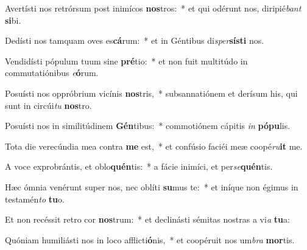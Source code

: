 \item Avertísti nos retrórsum post inimícos \textbf{nos}tros:~* et qui odérunt nos, diripié\textit{bant} \textbf{si}bi.
\item Dedísti nos tamquam oves es\textbf{cá}rum:~* et in Géntibus di\textit{sper}\textbf{sís}\textbf{ti} nos.
\item Vendidísti pópulum tuum sine \textbf{pré}tio:~* et non fuit multitúdo in commutatiónibus \textit{e}\textbf{ó}rum.
\item Posuísti nos oppróbrium vicínis \textbf{nos}tris,~* subsannatiónem et derísum his, qui sunt in circúi\textit{tu} \textbf{nos}tro.
\item Posuísti nos in similitúdinem \textbf{Gén}tibus:~* commotiónem cápitis \textit{in} \textbf{pó}\textbf{pu}lis.
\item Tota die verecúndia mea contra \textbf{me} est,~* et confúsio faciéi meæ coopé\textit{ru}\textbf{it} me.
\item A voce exprobrántis, et oblo\textbf{quén}tis:~* a fácie inimíci, et per\textit{se}\textbf{quén}tis.
\item Hæc ómnia venérunt super nos, nec oblíti \textbf{su}mus te:~* et iníque non égimus in testamén\textit{to} \textbf{tu}o.
\item Et non recéssit retro cor \textbf{nos}trum:~* et declinásti sémitas nostras a vi\textit{a} \textbf{tu}a:
\item Quóniam humiliásti nos in loco afflicti\textbf{ó}nis,~* et coopéruit nos um\textit{bra} \textbf{mor}tis.
